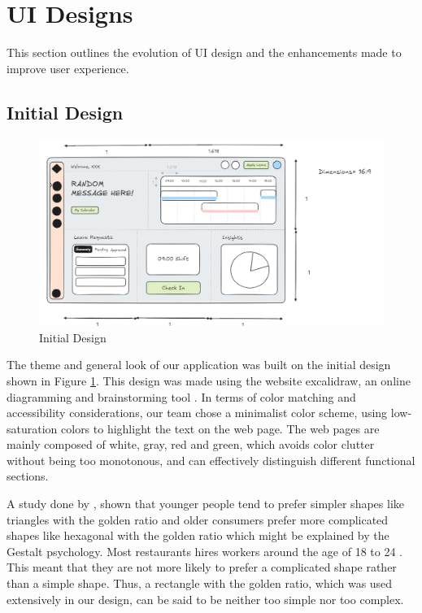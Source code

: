 \documentclass[a4paper,12pt, oneside]{report}
\begin{document}
\section{UI Designs}
This section outlines the evolution of UI design and the enhancements made to improve user experience.

\subsection{Initial Design}
\begin{figure}[H]
    \centering
    \includegraphics[width=\linewidth]{images/InitialDesign.png}
    \caption{Initial Design}
    \label{fig:initial-design}
\end{figure}

The theme and general look of our application was built on the initial design shown in Figure \ref{fig:initial-design}. This design was made using the website excalidraw, an online diagramming and brainstorming tool \citep{excalidraw}. In terms of color matching and accessibility considerations, our team chose a minimalist color scheme, using low-saturation colors to highlight the text on the web page. The web pages are mainly composed of white, gray, red and green, which avoids color clutter without being too monotonous, and can effectively distinguish different functional sections.

A study done by \citet{nikolic2011effect}, shown that younger people tend to prefer simpler shapes like triangles with the golden ratio and older consumers prefer more complicated shapes like hexagonal with the golden ratio which might be explained by the Gestalt psychology. Most restaurants hires workers around the age of 18 to 24 \citep{nationalrestaurantassociation2024demographics}. This meant that they are not more likely to prefer a complicated shape rather than a simple shape. Thus, a rectangle with the golden ratio, which was used extensively in our design, can be said to be neither too simple nor too complex.\\
\end{document}
